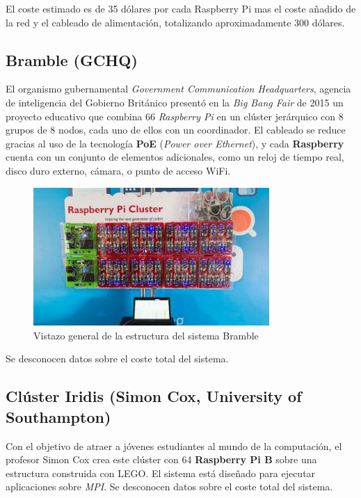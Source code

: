 El coste estimado es de 35 dólares por cada Raspberry Pi mas el coste añadido de la red y el cableado de alimentación, totalizando aproximadamente 300 dólares.

\subsection{Bramble (GCHQ)}

El organismo gubernamental \textit{Government Communication Headquarters}, agencia de inteligencia del Gobierno Británico presentó en la \textit{Big Bang Fair} de 2015 un proyecto educativo que combina 66 \textit{Raspberry Pi} en un clúster jerárquico con 8 grupos de 8 nodos, cada uno de ellos con un coordinador. El cableado se reduce gracias al uso de la tecnología \textbf{PoE} (\textit{Power over Ethernet}), y cada \textbf{Raspberry} cuenta con un conjunto de elementos adicionales, como un reloj de tiempo real, disco duro externo, cámara, o punto de acceso WiFi\cite{gchqbramble}.

\begin{figure}[H]
  \centering
  \includegraphics[width=0.8\textwidth]{Chapters/Chapter4/Figures/bramblegchq}
  \caption[Bramble]{Vistazo general de la estructura del sistema Bramble}
  \label{gchq:bramble}
\end{figure}

Se desconocen datos sobre el coste total del sistema.

\subsection{Clúster Iridis (Simon Cox, University of Southampton)}

Con el objetivo de atraer a jóvenes estudiantes al mundo de la computación, el profesor Simon Cox crea este clúster con 64 \textbf{Raspberry Pi B} sobre una estructura construida con LEGO\cite{cox:raspberry}. El sistema está diseñado para ejecutar aplicaciones sobre \textit{MPI}. Se desconocen datos sobre el coste total del sistema.

